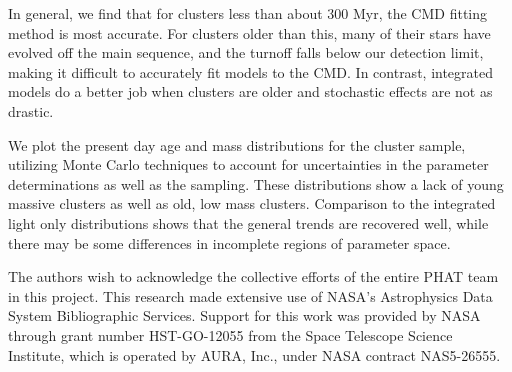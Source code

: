\documentclass{emulateapj}
\begin{document}
In general, we find that for clusters less than about 300 Myr, the CMD fitting method is most accurate.  For clusters older than this, many of their stars have evolved off the main sequence, and the turnoff falls below our detection limit, making it difficult to accurately fit models to the CMD.  In contrast, integrated models do a better job when clusters are older and stochastic effects are not as drastic.

We plot the present day age and mass distributions for the cluster sample, utilizing Monte Carlo techniques to account for uncertainties in the parameter determinations as well as the sampling.  These distributions show a lack of young massive clusters as well as old, low mass clusters.  Comparison to the integrated light only distributions shows that the general trends are recovered well, while there may be some differences in incomplete regions of parameter space.




\acknowledgements


{The authors wish to acknowledge the collective efforts of the entire PHAT team in this project.  This research made extensive use of NASA's Astrophysics Data System Bibliographic Services.  Support for this work was provided by NASA through grant number HST-GO-12055 from the Space Telescope Science Institute, which is operated by AURA, Inc., under NASA contract NAS5-26555.}



  

\end{document}
